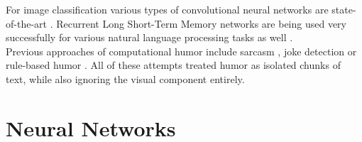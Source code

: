 \documentclass[draft,final,oneside]{vutinfth} %
\begin{document}
For image classification various types of convolutional neural networks are state-of-the-art \cite{dogsvscats}. Recurrent Long Short-Term Memory networks are being used very successfully for various natural language processing tasks as well \cite{reviewRNN}. \\

Previous approaches of computational humor include sarcasm \cite{Bamman2015ContextualizedSD}, joke detection \cite{Yang2015HumorRA} or rule-based humor \cite{HumoristBot}. All of these attempts treated humor as isolated chunks of text, while also ignoring the visual component entirely.

\section{Neural Networks}
\end{document}

